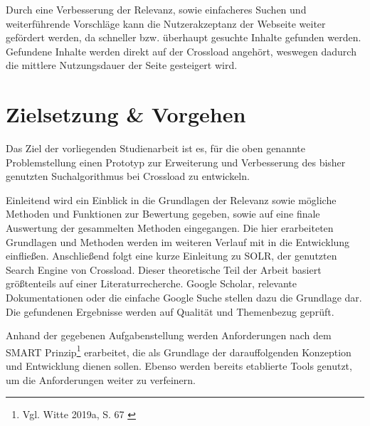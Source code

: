 Durch eine Verbesserung der Relevanz, sowie einfacheres Suchen und weiterführende Vorschläge kann die Nutzerakzeptanz der Webseite weiter gefördert werden, da schneller bzw. überhaupt gesuchte Inhalte gefunden werden.
Gefundene Inhalte werden direkt auf der Crossload angehört, weswegen dadurch die mittlere Nutzungsdauer der Seite gesteigert wird.

\section{Zielsetzung \& Vorgehen}
Das Ziel der vorliegenden Studienarbeit ist es, für die oben genannte Problemstellung einen Prototyp zur Erweiterung und Verbesserung des bisher genutzten Suchalgorithmus bei Crossload zu entwickeln.

Einleitend wird ein Einblick in die Grundlagen der Relevanz sowie mögliche Methoden und Funktionen zur Bewertung gegeben, sowie auf eine finale Auswertung der gesammelten Methoden eingegangen.
Die hier erarbeiteten Grundlagen und Methoden werden im weiteren Verlauf mit in die Entwicklung einfließen.
Anschließend folgt eine kurze Einleitung zu SOLR, der genutzten Search Engine von Crossload.
Dieser theoretische Teil der Arbeit basiert größtenteils auf einer Literaturrecherche.
Google Scholar, relevante Dokumentationen oder die einfache Google Suche stellen dazu die Grundlage dar.
Die gefundenen Ergebnisse werden auf Qualität und Themenbezug geprüft.

Anhand der gegebenen Aufgabenstellung werden Anforderungen nach dem SMART Prinzip\footnote{Vgl. Witte 2019a, S. 67 \cite{witte2016}} erarbeitet, die als Grundlage der darauffolgenden Konzeption und Entwicklung dienen sollen.
Ebenso werden bereits etablierte Tools genutzt, um die Anforderungen weiter zu verfeinern.

